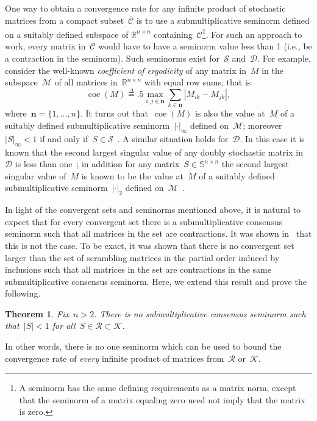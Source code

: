 \documentclass[letterpaper, 10 pt, conference]{ieeeconf}  %
\newtheorem{theorem}{Theorem}
\newcommand{\R}{\mathbb R}
\newcommand{\dfb}{\stackrel{\Delta}{=}}
\newcommand{\gensn}[1]{|#1|} %
\DeclareMathOperator{\coe}{coe} %
\newcommand{\stoc}{\mathbb{S}} %
\newcommand{\stocpd}{\mathcal{R}} %
\newcommand{\stocsary}{\mathcal{K}} %
\newcommand{\stocscr}{\mathcal{S}} %
\newcommand{\dblstocpd}{\mathcal{D}} %
\begin{document}
One way to obtain a convergence rate for any infinite product of stochastic matrices from a compact subset~$\mathcal{\bar C}$ is to use a 
submultiplicative seminorm defined on a suitably defined subspace of $\mathbb{R}^{n\times n}$ containing~$\mathcal{C}$\footnote{A seminorm has the same defining requirements as a matrix norm, except that the seminorm of a matrix equaling zero need not imply that the matrix is zero.}. For such an approach to work, every matrix in~$\mathcal{C}$ would have to have a seminorm value less than 1 (i.e., be a contraction in the seminorm). Such seminorms exist for~$\stocscr$ and~$\dblstocpd$. For example, consider the well-known \emph{coefficient of ergodicity} of any matrix in~$M$ in the subspace~$\mathcal{M}$ of all matrices in~$\R^{n \times n}$ with equal row sums; that is
\begin{equation}\label{eq:coe}
    \coe(M) \dfb .5 \max_{i,j \in \mathbf{n}} \sum_{k \in \mathbf{n}} |M_{ik} - M_{jk}|,
\end{equation}
where~$\mathbf{n} = \{1,\dots,n\}$. It turns out that~$\coe(M)$ is also the value at~$M$ of a suitably defined submultiplicative seminorm~$\gensn{\cdot}_\infty$ defined on~$\mathcal{M}$; moreover~$\gensn{S}_\infty < 1$ if and only if~$S \in \stocscr$~\cite{Ofir2025ConsensusSeminorms,DePasquale2024seminorms}. A similar situation holds for~$\dblstocpd$. In this case it is known that the second largest singular value of any doubly stochastic matrix in~$\mathcal{D}$ is less than one~\cite{Liu2011DetGossip}; in addition for any matrix~$S \in \stoc^{n \times n}$ the second largest singular value of~$M$ is known to be the value at~$M$ of a suitably defined submultiplicative seminorm~$\gensn{\cdot}_2$ defined on~$\mathcal{M}$~\cite{Liu2011DetGossip}.

In light of the convergent sets and seminorms mentioned above, it is natural to expect that for every convergent set there is a submultiplicative consensus seminorm such that all matrices in the set are contractions. It was shown in~\cite{Ofir2025ConsensusSeminorms} that this is not the case. To be exact, it was shown that there is no convergent set larger than the set of scrambling matrices in the partial order induced by inclusions such that all matrices in the set are contractions in the same submultiplicative consensus seminorm. Here, we extend this result and prove the following.
\begin{theorem}\label{thm:no_R_K_contraction}
    Fix~$n > 2$. There is no submultiplicative consensus seminorm such that~$\gensn{S} < 1$ for all~$S \in \stocpd \subset \stocsary$.
\end{theorem}
In other words, there is no one seminorm which can be used to bound the convergence rate of \emph{every} infinite product of matrices from~$\stocpd$ or~$\stocsary$. 
\end{document}
